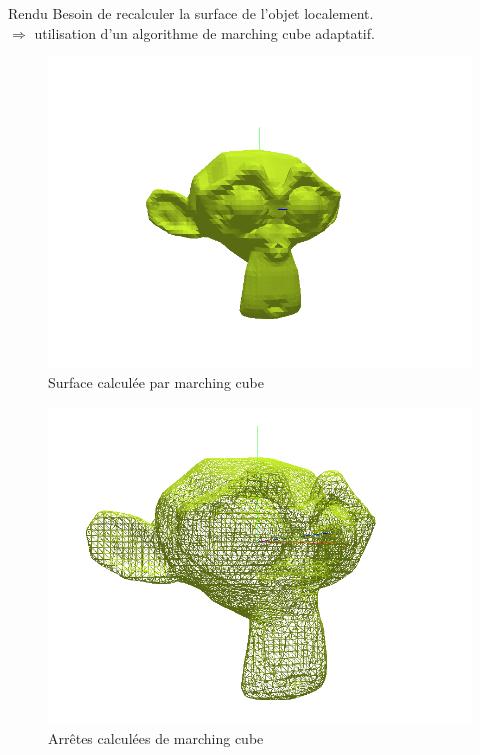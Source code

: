 \documentclass{beamer}
\begin{document}
\begin{frame}{Rendu}
  Besoin de recalculer la surface de l'objet localement.
  \\ $\Rightarrow$ utilisation d'un algorithme de marching cube
  adaptatif.\\
  \begin{minipage}{0.48\linewidth} 
    \begin{figure}[!h]
      \centering\includegraphics[scale=0.2]{FilledFace.png}
      \caption{Surface calculée par marching cube}
      \label{FilledFace}
    \end{figure}
  \end{minipage}
  \begin{minipage}{0.48\linewidth}
    \begin{figure}[!h]
      \centering\includegraphics[scale=0.2]{LineFace.png}
      \caption{Arrêtes calculées de marching cube}
      \label{LineFace}
    \end{figure}
  \end{minipage}
\end{frame}
\end{document}
